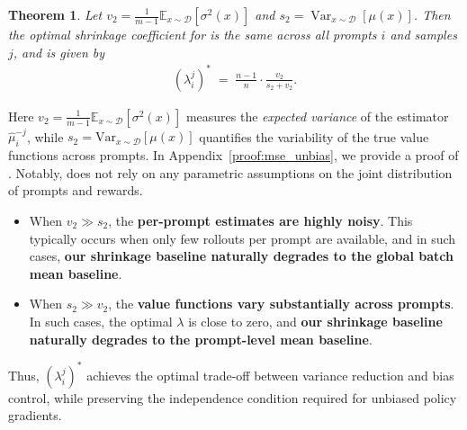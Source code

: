 \documentclass{article}
\theoremstyle{plain}
\newtheorem{theorem}{Theorem}
\theoremstyle{definition}
\theoremstyle{remark}
\newcommand{\E}{\mathbb{E}}
\DeclareMathOperator{\Var}{Var}
\begin{document}
  \begin{theorembox}
  \begin{theorem}
  \label{lem:mse_unbias}
  Let $v_2=\textstyle \tfrac{1}{m-1}\E_{x\sim\mathcal D}[\sigma^2(x)]$ and
  $s_2=\Var_{x\sim\mathcal D}[\mu(x)]$.
   Then the optimal shrinkage coefficient for  is the same across all prompts $i$ and samples $j$, and is given by
  \begin{align}
  (\lambda_i^j)^* \;=\; \tfrac{n-1}{n}\cdot \tfrac{v_2}{s_2 + v_2}.
  \label{eq:js-opt-coeff}
  \end{align}
  \end{theorem}
  \end{theorembox}
  Here $v_2 = \textstyle \tfrac{1}{m-1} \E_{x \sim \mathcal{D}}[\sigma^2(x)]$ measures the \emph{expected variance} of the estimator $\hat{\mu}_i^{-j}$, while $s_2 = \textstyle \mathrm{Var}_{x \sim \mathcal{D}}[\mu(x)]$ quantifies the variability of the true value functions across prompts. In Appendix~\ref{proof:mse_unbias}, we provide a proof of . Notably,  does not rely on any parametric assumptions on the joint distribution of prompts and rewards.
  
  \begin{itemize}[leftmargin=*, topsep=2pt, itemsep=2pt]
      \item When $v_2 \gg s_2$, the \textbf{per-prompt estimates are highly noisy}. This typically occurs when only few rollouts per prompt are available, and in such cases, \textbf{our shrinkage baseline naturally degrades to the global batch mean baseline}.
      \item When $s_2 \gg v_2$, the \textbf{value functions vary substantially across prompts}. In such cases, the optimal $\lambda$ is close to zero, and \textbf{our shrinkage baseline naturally degrades to the prompt-level mean baseline}.
  \end{itemize}
Thus, $(\lambda_i^j)^*$ achieves the optimal trade-off between variance reduction and bias control, while preserving the independence condition required for unbiased policy gradients. 
  
\end{document}

